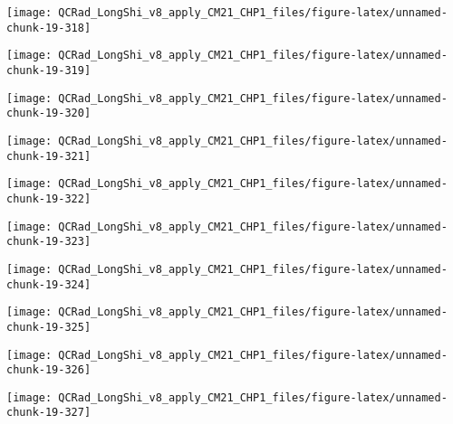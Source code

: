 \documentclass[
  10pt,
  a4paper,oneside]{article}
\begin{document}
\begin{center}\texttt{[image: QCRad\_LongShi\_v8\_apply\_CM21\_CHP1\_files/figure-latex/unnamed-chunk-19-318]} \end{center}

\begin{center}\texttt{[image: QCRad\_LongShi\_v8\_apply\_CM21\_CHP1\_files/figure-latex/unnamed-chunk-19-319]} \end{center}

\begin{center}\texttt{[image: QCRad\_LongShi\_v8\_apply\_CM21\_CHP1\_files/figure-latex/unnamed-chunk-19-320]} \end{center}

\begin{center}\texttt{[image: QCRad\_LongShi\_v8\_apply\_CM21\_CHP1\_files/figure-latex/unnamed-chunk-19-321]} \end{center}

\begin{center}\texttt{[image: QCRad\_LongShi\_v8\_apply\_CM21\_CHP1\_files/figure-latex/unnamed-chunk-19-322]} \end{center}

\begin{center}\texttt{[image: QCRad\_LongShi\_v8\_apply\_CM21\_CHP1\_files/figure-latex/unnamed-chunk-19-323]} \end{center}

\begin{center}\texttt{[image: QCRad\_LongShi\_v8\_apply\_CM21\_CHP1\_files/figure-latex/unnamed-chunk-19-324]} \end{center}

\begin{center}\texttt{[image: QCRad\_LongShi\_v8\_apply\_CM21\_CHP1\_files/figure-latex/unnamed-chunk-19-325]} \end{center}

\begin{center}\texttt{[image: QCRad\_LongShi\_v8\_apply\_CM21\_CHP1\_files/figure-latex/unnamed-chunk-19-326]} \end{center}

\begin{center}\texttt{[image: QCRad\_LongShi\_v8\_apply\_CM21\_CHP1\_files/figure-latex/unnamed-chunk-19-327]} \end{center}
\end{document}

